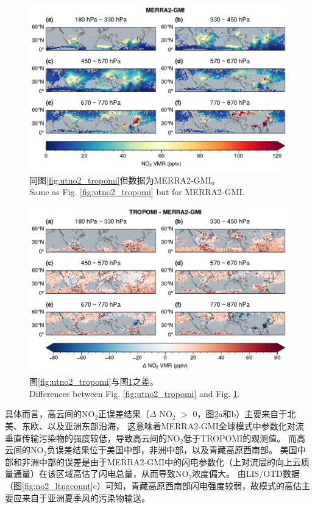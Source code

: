 \begin{figure}[htbp]
    \centering
    \includegraphics[width=15cm]{./figures/utno2_merra2-gmi.pdf}
    \caption{
    同图\ref{fig:utno2_tropomi}但数据为MERRA2-GMI。 \\
    Same as Fig. \ref{fig:utno2_tropomi} but for MERRA2-GMI.
    }
    \label{fig:utno2_merra2}
\end{figure}

\begin{figure}[htbp]
    \centering
    \includegraphics[width=15cm]{./figures/utno2_delta.pdf}
    \caption{
    图\ref{fig:utno2_tropomi}与图\ref{fig:utno2_merra2}之差。 \\
    Differences between Fig. \ref{fig:utno2_tropomi} and Fig. \ref{fig:utno2_merra2}.
    }
    \label{fig:utno2_delta}
\end{figure}


具体而言，高云间的NO$_2$正误差结果（$\Delta$ NO$_2$ $>$ 0，图\ref{fig:utno2_delta}a和b）主要来自于北美、东欧、以及亚洲东部沿海，
这意味着MERRA2-GMI全球模式中参数化对流垂直传输污染物的强度较低，导致高云间的NO$_2$低于TROPOMI的观测值。
而高云间的NO$_2$负误差结果位于美国中部，非洲中部，以及青藏高原西南部。
美国中部和非洲中部的误差是由于MERRA2-GMI中的闪电参数化（上对流层的向上云质量通量）在该区域高估了闪电总量，从而导致NO$_2$浓度偏大\citep{Allen.2002,Allen.2010}。
由LIS/OTD数据（图\ref{fig:no2_ltngcount}c）可知，青藏高原西南部闪电强度较弱，故模式的高估主要应来自于亚洲夏季风的污染物输送。

